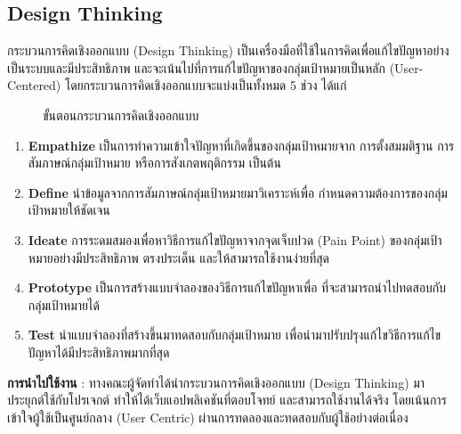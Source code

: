 \subsection{Design Thinking}
กระบวนการคิดเชิงออกแบบ (Design Thinking)\cite{Dam2024}
เป็นเครื่องมือที่ใช้ในการคิดเพื่อแก้ไขปัญหาอย่างเป็นระบบและมีประสิทธิภาพ
และจะเน้นไปที่การแก้ไขปัญหาของกลุ่มเป้าหมายเป็นหลัก (User-Centered)
โดยกระบวนการคิดเชิงออกแบบจะแบ่งเป็นทั้งหมด 5 ช่วง ได้แก่
\begin{figure}[!h]\centering
      \setlength{\fboxrule}{0.2mm} %
      \setlength{\fboxsep}{0.5cm}
      \caption{ขั้นตอนกระบวนการคิดเชิงออกแบบ\cite{DT}}\label{fig:design thinking}
\end{figure}
\begin{enumerate}
      \item \textbf{Empathize} เป็นการทำความเข้าใจปัญหาที่เกิดขึ้นของกลุ่มเป้าหมายจาก
            การตั้งสมมติฐาน การสัมภาษณ์กลุ่มเป้าหมาย หรือการสังเกตพฤติกรรม เป็นต้น
      \item \textbf{Define} นำข้อมูลจากการสัมภาษณ์กลุ่มเป้าหมายมาวิเคราะห์เพื่อ
            กำหนดความต้องการของกลุ่มเป้าหมายให้ชัดเจน
      \item \textbf{Ideate} การระดมสมองเพื่อหาวิธีการแก้ไขปัญหาจากจุดเจ็บปวด
            (Pain Point) ของกลุ่มเป้าหมายอย่างมีประสิทธิภาพ ตรงประเด็น
            และให้สามารถใช้งานง่ายที่สุด
      \item \textbf{Prototype} เป็นการสร้างแบบจำลองของวิธีการแก้ไขปัญหาเพื่อ
            ที่จะสามารถนำไปทดสอบกับกลุ่มเป้าหมายได้
      \item \textbf{Test} นำแบบจำลองที่สร้างขึ้นมาทดสอบกับกลุ่มเป้าหมาย
            เพื่อนำมาปรับปรุงแก้ไขวิธีการแก้ไขปัญหาได้มีประสิทธิภาพมากที่สุด
\end{enumerate}
\textbf{การนำไปใช้งาน} : ทางคณะผู้จัดทำได้นำกระบวนการคิดเชิงออกแบบ
(Design Thinking) มาประยุกต์ใช้กับโปรเจกต์ ทำให้ได้เว็บแอปพลิเคชันที่ตอบโจทย์
และสามารถใช้งานได้จริง โดยเน้นการเข้าใจผู้ใช้เป็นศูนย์กลาง (User Centric)
ผ่านการทดลองและทดสอบกับผู้ใช้อย่างต่อเนื่อง
